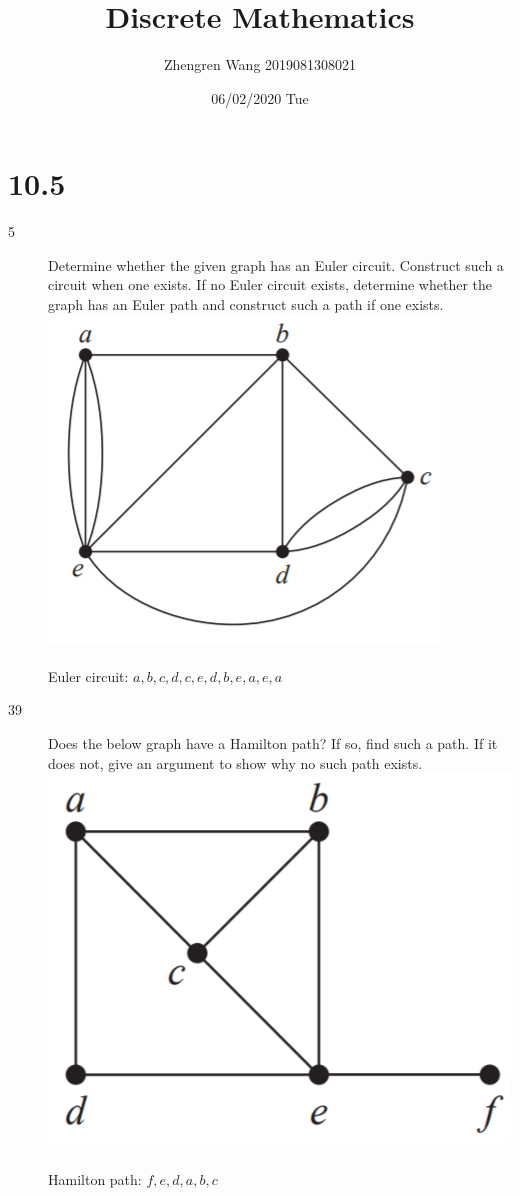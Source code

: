 \documentclass[UTF8]{article}
\title{Discrete Mathematics}
\author{Zhengren Wang 2019081308021}
\date{06/02/2020 Tue}
\begin{document}
\maketitle 

\part{10.5}
\begin{description}
    \item[5]Determine whether the given graph has an Euler circuit. Construct such a circuit when one exists. If no Euler circuit exists, determine whether the graph has an Euler path and construct such a path if one exists.  \\
        \includegraphics[scale=0.3]{../imgs/10_5_5.png}\\\\
            Euler circuit: $a, b, c, d, c, e, d, b, e, a, e, a$\\


    \item[39]Does the below graph have a Hamilton path? If so, find such a path. If it does not, give an argument to show why no such path exists.   \\
        \includegraphics[scale=0.3]{../imgs/10_5_39.png}\\\\
            Hamilton path: $f, e, d, a, b, c$\\

\end{description}
\end{document}
